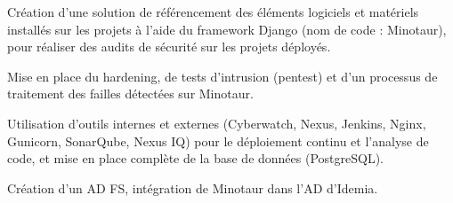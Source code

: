 \documentclass[a4paper]{../shared/cv} %
\begin{document}
\begin{cvlist}
{\begin{cvbullets}
    \item Création d'une solution de référencement des éléments logiciels et matériels installés sur les projets à l'aide du framework Django (nom de code : Minotaur), pour réaliser des audits de sécurité sur les projets déployés.
    \item Mise en place du hardening, de tests d'intrusion (pentest) et d'un processus de traitement des failles détectées sur Minotaur.
    \item Utilisation d'outils internes et externes (Cyberwatch, Nexus, Jenkins, Nginx, Gunicorn, SonarQube, Nexus IQ) pour le déploiement continu et l'analyse de code, et mise en place complète de la base de données (PostgreSQL).
    \item Création d'un AD FS, intégration de Minotaur dans l'AD d'Idemia.
    \end{cvbullets}}
\end{cvlist}



\begin{cvlist} %
\end{cvlist}



\begin{cvlist} %
\end{cvlist}
\end{document}
